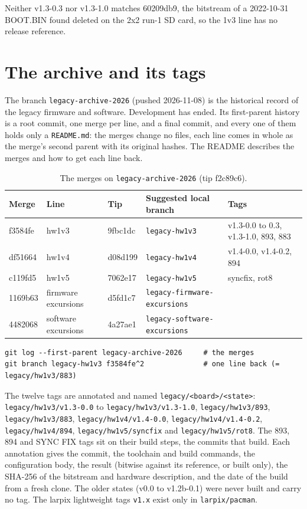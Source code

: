 \documentclass[11pt]{article}
\newcommand{\br}[1]{\texttt{#1}}
\newcommand{\h}[1]{\texttt{#1}}
\begin{document}
Neither v1.3-0.3 nor v1.3-1.0 matches 60209db9, the bitstream of a 2022-10-31 BOOT.BIN found deleted on the 2x2 run-1
SD card, so the 1v3 line has no release reference.

\section{The archive and its tags}\label{sec:archive}

The branch \br{legacy-archive-2026} (pushed 2026-11-08) is the historical record of the legacy firmware and software.
Development has ended.  Its first-parent history is a root commit, one merge per line, and a final commit, and every
one of them holds only a \h{README.md}:  the merges change no files, each line comes in whole as the merge's second
parent with its original hashes.  The README describes the merges and how to get each line back.

\begin{table}[h]
\centering\small
\begin{tabularx}{\textwidth}{@{}llllL@{}}
\toprule
Merge & Line & Tip & Suggested local branch & Tags \\
\midrule
f3584fe & hw1v3 & 9fbc1dc & \br{legacy-hw1v3} & v1.3-0.0 to 0.3, v1.3-1.0, 893, 883 \\
df51664 & hw1v4 & d08d199 & \br{legacy-hw1v4} & v1.4-0.0, v1.4-0.2, 894 \\
c119fd5 & hw1v5 & 7062e17 & \br{legacy-hw1v5} & syncfix, rot8 \\
1169b63 & firmware excursions & d5fd1c7 & \br{legacy-firmware-excursions} & \\
4482068 & software excursions & 4a27ae1 & \br{legacy-software-excursions} & \\
\bottomrule
\end{tabularx}
\caption{The merges on \br{legacy-archive-2026} (tip f2c89c6).}
\end{table}

\begin{verbatim}
git log --first-parent legacy-archive-2026     # the merges
git branch legacy-hw1v3 f3584fe^2              # one line back (= legacy/hw1v3/883)
\end{verbatim}

The twelve tags are annotated and named \h{legacy/<board>/<state>}:  \h{legacy/hw1v3/v1.3-0.0} to
\h{legacy/hw1v3/v1.3-1.0}, \h{legacy/hw1v3/893}, \h{legacy/hw1v3/883}, \h{legacy/hw1v4/v1.4-0.0},
\h{legacy/hw1v4/v1.4-0.2}, \h{legacy/hw1v4/894}, \h{legacy/hw1v5/syncfix} and \h{legacy/hw1v5/rot8}.  The 893, 894
and SYNC FIX tags sit on their build steps, the commits that build.  Each annotation gives the commit, the toolchain and
build commands, the configuration body, the result (bitwise against its reference, or built only), the SHA-256 of
the bitstream and hardware description, and the date of the build from a fresh clone.  The older states (v0.0 to
v1.2b-0.1) were never built and carry no tag.  The larpix lightweight tags \h{v1.x} exist only in \h{larpix/pacman}.
\end{document}
